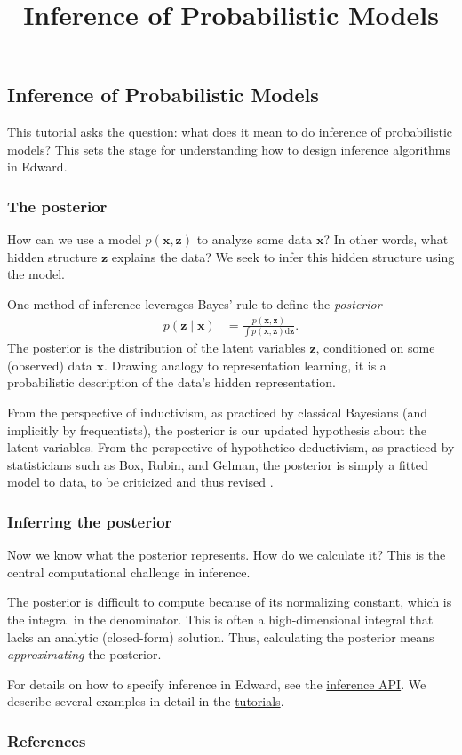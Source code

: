 \title{Inference of Probabilistic Models}

\subsection{Inference of Probabilistic Models}

This tutorial asks the question: what does it mean to do inference of
probabilistic models? This sets the stage for understanding how to
design inference algorithms in Edward.

\subsubsection{The posterior}

How can we use a model $p(\mathbf{x}, \mathbf{z})$ to analyze some
data $\mathbf{x}$? In other words, what hidden structure $\mathbf{z}$
explains the data? We seek to infer this hidden structure using the
model.

One method of inference leverages Bayes' rule to define the
\emph{posterior}
\begin{align*}
  p(\mathbf{z} \mid \mathbf{x})
  &=
  \frac{p(\mathbf{x}, \mathbf{z})}{\int p(\mathbf{x}, \mathbf{z}) \text{d}\mathbf{z}}.
\end{align*}
The posterior is the distribution of the latent variables
$\mathbf{z}$, conditioned on some (observed) data $\mathbf{x}$.
Drawing analogy to representation learning, it is a probabilistic
description of the data's hidden representation.

From the perspective of inductivism, as practiced by classical
Bayesians (and implicitly by frequentists),
the posterior is our updated hypothesis about the latent variables.
From the perspective of hypothetico-deductivism, as practiced by
statisticians such as Box, Rubin, and Gelman, the posterior is simply
a fitted model to data, to be criticized and thus revised
\citep{box1982apology,gelman2013philosophy}.

\subsubsection{Inferring the posterior}

Now we know what the posterior represents. How do we calculate it? This is the
central computational challenge in inference.

The posterior is difficult to compute because of its normalizing
constant, which is the integral in the denominator.
This is often a high-dimensional integral that lacks an analytic (closed-form)
solution. Thus, calculating the posterior means \emph{approximating} the
posterior.

For details on how to specify inference in Edward, see the
\href{/api/ed/inferences}{inference API}. We describe several examples in
detail in the \href{/tutorials/}{tutorials}.


\subsubsection{References}\label{references}

